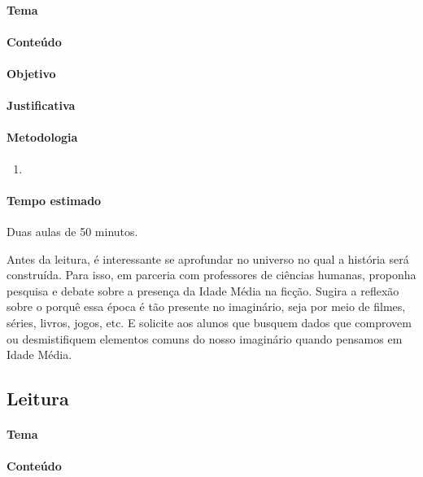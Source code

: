 \documentclass[11pt]{extarticle}
\begin{document}
\paragraph{Tema}

\paragraph{Conteúdo}

\paragraph{Objetivo}

\paragraph{Justificativa}

\paragraph{Metodologia}
\begin{enumerate}

\item 

\end{enumerate}

\paragraph{Tempo estimado} Duas aulas de 50 minutos. 

Antes da leitura, é interessante se aprofundar no universo
no qual a história será construída. Para isso, em parceria com
professores de ciências humanas, proponha pesquisa e debate sobre a
presença da Idade Média na ficção. Sugira a reflexão sobre o porquê essa
época é tão presente no imaginário, seja por meio de filmes, séries,
livros, jogos, etc. E solicite aos alunos que busquem dados que
comprovem ou desmistifiquem elementos comuns do nosso imaginário quando
pensamos em Idade Média.

\subsection{Leitura}

\paragraph{Tema}

\paragraph{Conteúdo}
\end{document}
